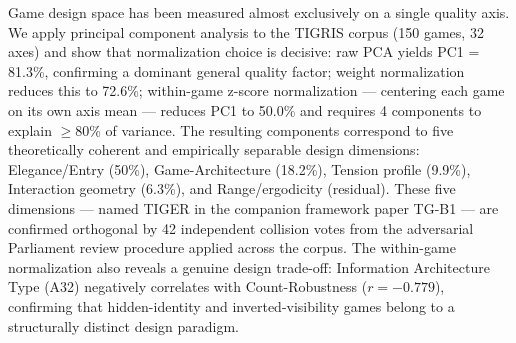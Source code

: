 Game design space has been measured almost exclusively on a single quality axis.
We apply principal component analysis to the TIGRIS corpus (150 games, 32 axes)
and show that normalization choice is decisive: raw PCA yields PC1 = 81.3\%,
confirming a dominant general quality factor; weight normalization reduces this to 72.6\%;
within-game z-score normalization --- centering each game on its own axis mean ---
reduces PC1 to 50.0\% and requires 4 components to explain $\geq$80\% of variance.
The resulting components correspond to five theoretically coherent and empirically separable
design dimensions: Elegance/Entry (50\%), Game-Architecture (18.2\%), Tension profile (9.9\%),
Interaction geometry (6.3\%), and Range/ergodicity (residual).
These five dimensions --- named TIGER in the companion framework paper TG-B1 ---
are confirmed orthogonal by 42 independent collision votes from the adversarial
Parliament review procedure applied across the corpus.
The within-game normalization also reveals a genuine design trade-off:
Information Architecture Type (A32) negatively correlates with Count-Robustness
($r = -0.779$), confirming that hidden-identity and inverted-visibility games
belong to a structurally distinct design paradigm.
